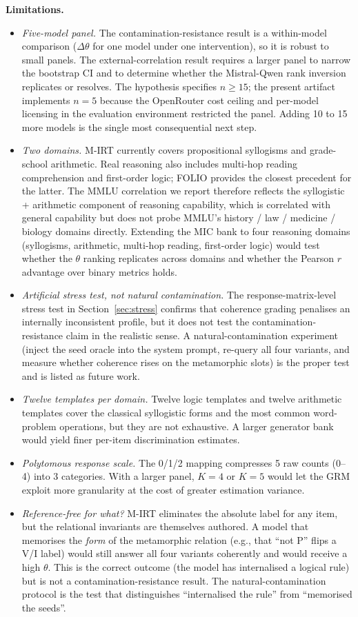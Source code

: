 \documentclass[11pt,letterpaper]{article}
\begin{document}
\textbf{Limitations.}
\begin{itemize}
  \item \emph{Five-model panel.} The contamination-resistance result is a within-model comparison ($\Delta\theta$ for one model under one intervention), so it is robust to small panels. The external-correlation result requires a larger panel to narrow the bootstrap CI and to determine whether the Mistral-Qwen rank inversion replicates or resolves. The hypothesis specifies $n \geq 15$; the present artifact implements $n = 5$ because the OpenRouter cost ceiling and per-model licensing in the evaluation environment restricted the panel. Adding 10 to 15 more models is the single most consequential next step.
  \item \emph{Two domains.} M-IRT currently covers propositional syllogisms and grade-school arithmetic. Real reasoning also includes multi-hop reading comprehension and first-order logic; FOLIO \citep{Han2022} provides the closest precedent for the latter. The MMLU correlation we report therefore reflects the syllogistic + arithmetic component of reasoning capability, which is correlated with general capability but does not probe MMLU's history / law / medicine / biology domains directly. Extending the MIC bank to four reasoning domains (syllogisms, arithmetic, multi-hop reading, first-order logic) would test whether the $\theta$ ranking replicates across domains and whether the Pearson $r$ advantage over binary metrics holds.
  \item \emph{Artificial stress test, not natural contamination.} The response-matrix-level stress test in Section~\ref{sec:stress} confirms that coherence grading penalises an internally inconsistent profile, but it does not test the contamination-resistance claim in the realistic sense. A natural-contamination experiment (inject the seed oracle into the system prompt, re-query all four variants, and measure whether coherence rises on the metamorphic slots) is the proper test and is listed as future work.
  \item \emph{Twelve templates per domain.} Twelve logic templates and twelve arithmetic templates cover the classical syllogistic forms and the most common word-problem operations, but they are not exhaustive. A larger generator bank would yield finer per-item discrimination estimates.
  \item \emph{Polytomous response scale.} The 0/1/2 mapping compresses 5 raw counts (0–4) into 3 categories. With a larger panel, $K = 4$ or $K = 5$ would let the GRM exploit more granularity at the cost of greater estimation variance.
  \item \emph{Reference-free for what?} M-IRT eliminates the absolute label for any item, but the relational invariants are themselves authored. A model that memorises the \emph{form} of the metamorphic relation (e.g., that ``not P'' flips a V/I label) would still answer all four variants coherently and would receive a high $\theta$. This is the correct outcome (the model has internalised a logical rule) but is not a contamination-resistance result. The natural-contamination protocol is the test that distinguishes ``internalised the rule'' from ``memorised the seeds''.
\end{itemize}
\end{document}
